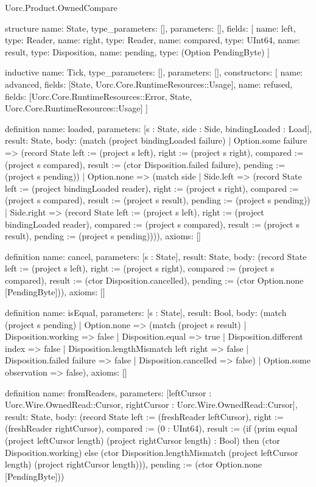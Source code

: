 \begin{lexlean}{Uorc.Product.OwnedCompare}
\begin{semanticmodule}
structure{
  name: State,
  type_parameters: [],
  parameters: [],
  fields: [
    {name: left, type: Reader},
    {name: right, type: Reader},
    {name: compared, type: UInt64},
    {name: result, type: Disposition},
    {name: pending, type: (Option PendingByte)}
  ]
}

inductive{
  name: Tick,
  type_parameters: [],
  parameters: [],
  constructors: [
    {name: advanced, fields: [State, Uorc.Core.RuntimeResources::Usage]},
    {
      name: refused,
      fields: [Uorc.Core.RuntimeResources::Error, State, Uorc.Core.RuntimeResources::Usage]
    }
  ]
}

definition{
  name: loaded,
  parameters: [s : State, side : Side, bindingLoaded : Load],
  result: State,
  body: (match (project bindingLoaded failure)
    | Option.some failure => (record State {left := (project s left), right := (project s right), compared := (project s compared), result := (ctor Disposition.failed failure), pending := (project s pending)})
    | Option.none => (match side
      | Side.left => (record State {left := (project bindingLoaded reader), right := (project s right), compared := (project s compared), result := (project s result), pending := (project s pending)})
      | Side.right => (record State {left := (project s left), right := (project bindingLoaded reader), compared := (project s compared), result := (project s result), pending := (project s pending)}))),
  axioms: []
}

definition{
  name: cancel,
  parameters: [s : State],
  result: State,
  body: (record State {left := (project s left), right := (project s right), compared := (project s compared), result := (ctor Disposition.cancelled), pending := (ctor Option.none [PendingByte])}),
  axioms: []
}

definition{
  name: isEqual,
  parameters: [s : State],
  result: Bool,
  body: (match (project s pending)
    | Option.none => (match (project s result)
      | Disposition.working => false
      | Disposition.equal => true
      | Disposition.different index => false
      | Disposition.lengthMismatch left right => false
      | Disposition.failed failure => false
      | Disposition.cancelled => false)
    | Option.some observation => false),
  axioms: []
}

definition{
  name: fromReaders,
  parameters: [leftCursor : Uorc.Wire.OwnedRead::Cursor, rightCursor : Uorc.Wire.OwnedRead::Cursor],
  result: State,
  body: (record State {left := (freshReader leftCursor), right := (freshReader rightCursor), compared := (0 : UInt64), result := (if (prim equal (project leftCursor length) (project rightCursor length) : Bool) then (ctor Disposition.working) else (ctor Disposition.lengthMismatch (project leftCursor length) (project rightCursor length))), pending := (ctor Option.none [PendingByte])})
}


\end{semanticmodule}
\end{lexlean}
